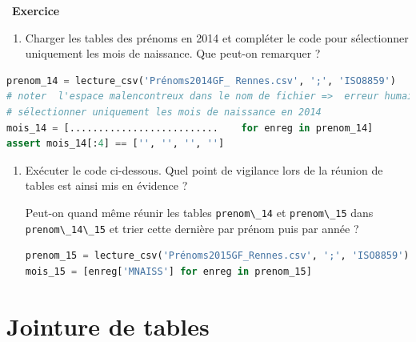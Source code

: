\documentclass[
  11pt,
]{article}
\newcommand{\passthrough}[1]{#1}
\providecommand{\tightlist}{%
  \setlength{\itemsep}{0pt}\setlength{\parskip}{0pt}}
\newcounter{exo}
\newenvironment{exercice}[1]
{\par \medskip   \addtocounter{exo}{1} \noindent  
\begin{bclogo}[arrondi =0.1,   noborder = true, logo=\bccrayon, marge=4]{~\textbf{Exercice} \textbf{\theexo} {\itshape #1} }  \par}
{
\end{bclogo}
 \par \bigskip }
\newcounter{rque}
\newcounter{def}
\begin{document}
\begin{exercice}{}
\begin{enumerate}
\def\labelenumi{\arabic{enumi}.}
\setcounter{enumi}{5}
\tightlist
\item
  Charger les tables des prénoms en 2014 et compléter le code pour
  sélectionner uniquement les mois de naissance. Que peut-on remarquer ?
\end{enumerate}

\begin{lstlisting}[language=Python]
prenom_14 = lecture_csv('Prénoms2014GF_ Rennes.csv', ';', 'ISO8859')
# noter  l'espace malencontreux dans le nom de fichier =>  erreur humaine
# sélectionner uniquement les mois de naissance en 2014
mois_14 = [..........................    for enreg in prenom_14]
assert mois_14[:4] == ['', '', '', '']
\end{lstlisting}

\begin{enumerate}
\def\labelenumi{\arabic{enumi}.}
\setcounter{enumi}{6}
\item
  Exécuter le code ci-dessous. Quel point de vigilance lors de la
  réunion de tables est ainsi mis en évidence ?

  Peut-on quand même réunir les tables
  \passthrough{\lstinline!prenom\_14!} et
  \passthrough{\lstinline!prenom\_15!} dans
  \passthrough{\lstinline!prenom\_14\_15!} et trier cette dernière par
  prénom puis par année ?

\begin{lstlisting}[language=Python]
prenom_15 = lecture_csv('Prénoms2015GF_Rennes.csv', ';', 'ISO8859')
mois_15 = [enreg['MNAISS'] for enreg in prenom_15]
\end{lstlisting}
\end{enumerate}

\end{exercice}

\hypertarget{jointure-de-tables}{%
\section{Jointure de tables}\label{jointure-de-tables}}
\end{document}
